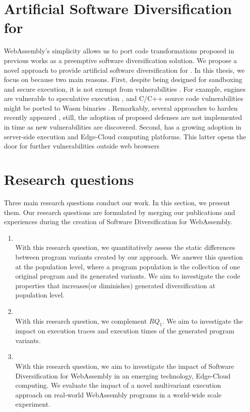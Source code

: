 \section{Artificial Software Diversification for \wasm}


WebAssembly's simplicity allows us to port code transformations proposed in previous works as a preemptive software diversification solution.
We propose a novel approach to provide artificial software diversification for \wasm.
In this thesis, we focus on \wasm because two main reasons. First,
despite being designed for sandboxing and secure execution, it is not exempt from vulnerabilities \cite{WebAssemblySecurity}.
For example, \wasm engines are vulnerable to speculative execution \cite{Narayan2021Swivel}, and C/C++ source code vulnerabilities might be ported to Wasm binaries \cite{DeRoover2022}.  
Remarkably, several approaches to harden \wasm recently appeared \cite{johnson2021}, still, the adoption of proposed defenses are not implemented in time as new vulnerabilities are discovered.
Second, \wasm has a growing adoption in server-side execution and Edge-Cloud computing platforms.
This latter opens the door for further vulnerabilities outside web browsers

\section{Research questions}
\label{intro:definition:rq}

Three main research questions conduct our work.
In this section, we present them. 
Our research questions are formulated by merging our publications and experiences during the creation of Software Diversification for WebAssembly. 


\begin{enumerate}[label=\subscript{RQ}{{\arabic*}}]
    \item \textbf{\rqone}\\
    With this research question, we quantitatively assess the static differences between program variants created by our approach. We answer this question at the population level, where a program population is the collection of one original program and its generated variants. We aim to investigate the code properties that increases(or diminishes) generated diversification at population level. 

    \item \textbf{\rqtwo} \\
    With this research question, we complement $RQ_1$. We aim to investigate the impact on execution traces and execution times of the generated program variants.

    \item \textbf{\rqthree} \\
    With this research question, we aim to investigate the impact of Software Diversification for WebAssembly in an emerging technology, Edge-Cloud computing. We evaluate the impact of a novel multivariant execution approach on real-world WebAssembly programs in a world-wide scale experiment.
    
    
\end{enumerate}


